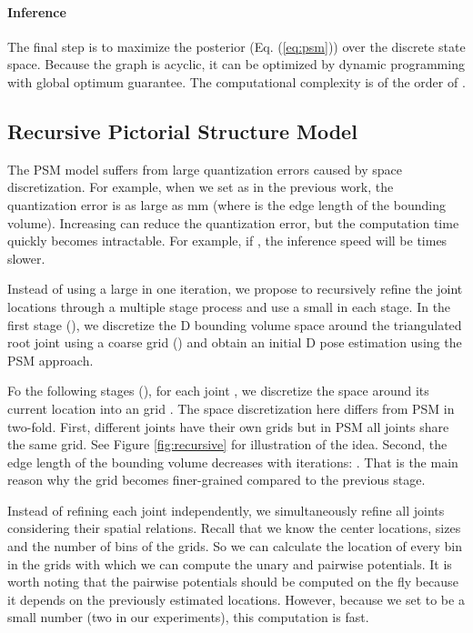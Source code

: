 \documentclass[10pt,twocolumn,letterpaper]{article}
\begin{document}
\paragraph{Inference}
The final step is to maximize the posterior (Eq. (\ref{eq:psm})) over the discrete state space. Because the graph is acyclic, it can be optimized by dynamic programming with global optimum guarantee. The computational complexity is of the order of .




\subsection{Recursive Pictorial Structure Model}
The PSM model suffers from large quantization errors caused by space discretization. For example, when we set  as in the previous work, the quantization error is as large as mm (\ie  where  is the edge length of the bounding volume). Increasing  can reduce the quantization error, but the computation time quickly becomes intractable. For example, if , the inference speed will be  times slower.




Instead of using a large  in one iteration, we propose to recursively refine the joint locations through a multiple stage process and use a small  in each stage. In the first stage (), we discretize the D bounding volume space around the triangulated root joint using a coarse grid () and obtain an initial D pose estimation  using the PSM approach.


Fo the following stages (), for each joint , we discretize the space around its current location  into an  grid . The space discretization here differs from PSM in two-fold. First, different joints have their own grids but in PSM all joints share the same grid. See Figure \ref{fig:recursive} for illustration of the idea. Second, the edge length of the bounding volume decreases with iterations: . That is the main reason why the grid becomes finer-grained compared to the previous stage.




Instead of refining each joint independently, we simultaneously refine all joints considering their spatial relations. Recall that we know the center locations, sizes and the number of bins of the grids. So we can calculate the location of every bin in the grids with which we can compute the unary and pairwise potentials. It is worth noting that the pairwise potentials should be computed on the fly because it depends on the previously estimated locations. However, because we set  to be a small number (two in our experiments), this computation is fast. 
\end{document}
